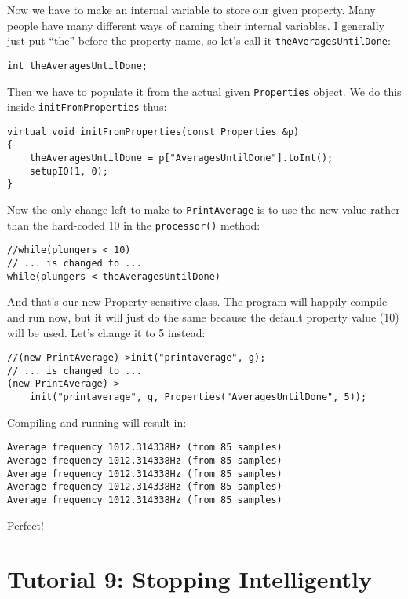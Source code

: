 Now we have to make an internal variable to store our given property. Many people have many different ways of naming their internal variables. I generally just put ``the'' before the property name, so let's call it \texttt{theAveragesUntilDone}:

\begin{verbatim}
int theAveragesUntilDone;
\end{verbatim}

Then we have to populate it from the actual given \texttt{Properties} object. We do this inside \texttt{initFromProperties} thus:

\begin{verbatim}
virtual void initFromProperties(const Properties &p)
{
    theAveragesUntilDone = p["AveragesUntilDone"].toInt();
    setupIO(1, 0);
}
\end{verbatim}

Now the only change left to make to \texttt{PrintAverage} is to use the new value rather than the hard-coded 10 in the \texttt{processor()} method:

\begin{verbatim}
//while(plungers < 10)
// ... is changed to ...
while(plungers < theAveragesUntilDone)
\end{verbatim}

And that's our new Property-sensitive class. The program will happily compile and run now, but it will just do the same because the default property value (10) will be used. Let's change it to 5 instead:

\begin{verbatim}
//(new PrintAverage)->init("printaverage", g);
// ... is changed to ...
(new PrintAverage)->
    init("printaverage", g, Properties("AveragesUntilDone", 5));
\end{verbatim}

Compiling and running will result in:

\begin{verbatim}
Average frequency 1012.314338Hz (from 85 samples)
Average frequency 1012.314338Hz (from 85 samples)
Average frequency 1012.314338Hz (from 85 samples)
Average frequency 1012.314338Hz (from 85 samples)
Average frequency 1012.314338Hz (from 85 samples)
\end{verbatim}

Perfect!




\section{Tutorial 9: Stopping Intelligently}

